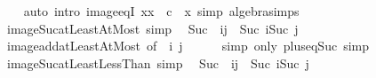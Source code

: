\begin{isabellebody}
%
\isadelimproof
\ \ %
\endisadelimproof
%
\isatagproof
{}\isamarkupfalse%
\ {\isacharparenleft}{\kern0pt}auto\ intro{\isacharbang}{\kern0pt}{\isacharcolon}{\kern0pt}\ image{\isacharunderscore}{\kern0pt}eqI{\isacharbrackleft}{\kern0pt}\ x{\isacharequal}{\kern0pt}{\isachardoublequoteopen}x\ {\isacharminus}{\kern0pt}\ c{\isachardoublequoteclose}\ \ x{\isacharbrackright}{\kern0pt}\ simp{\isacharcolon}{\kern0pt}\ algebra{\isacharunderscore}{\kern0pt}simps{\isacharparenright}{\kern0pt}%
\endisatagproof
{\isafoldproof}%
%
\isadelimproof
\isanewline
%
\endisadelimproof
\isanewline
{}\isamarkupfalse%
\isanewline
\isanewline
{}\isamarkupfalse%
\ image{\isacharunderscore}{\kern0pt}Suc{\isacharunderscore}{\kern0pt}atLeastAtMost\ {\isacharbrackleft}{\kern0pt}simp{\isacharbrackright}{\kern0pt}{\isacharcolon}{\kern0pt}\isanewline
\ \ {\isachardoublequoteopen}Suc\ {\isacharbackquote}{\kern0pt}\ {\isacharbraceleft}{\kern0pt}i{\isachardot}{\kern0pt}{\isachardot}{\kern0pt}j{\isacharbraceright}{\kern0pt}\ {\isacharequal}{\kern0pt}\ {\isacharbraceleft}{\kern0pt}Suc\ i{\isachardot}{\kern0pt}{\isachardot}{\kern0pt}Suc\ j{\isacharbraceright}{\kern0pt}{\isachardoublequoteclose}\isanewline
%
\isadelimproof
\ \ %
\endisadelimproof
%
\isatagproof
{}\isamarkupfalse%
\ image{\isacharunderscore}{\kern0pt}add{\isacharunderscore}{\kern0pt}atLeastAtMost\ {\isacharbrackleft}{\kern0pt}of\ {}\ i\ j{\isacharbrackright}{\kern0pt}\isanewline
\ \ \ \ \isamarkupfalse%
\ {\isacharparenleft}{\kern0pt}simp\ only{\isacharcolon}{\kern0pt}\ plus{\isacharunderscore}{\kern0pt}{}{\isacharunderscore}{\kern0pt}eq{\isacharunderscore}{\kern0pt}Suc{\isacharparenright}{\kern0pt}\ simp%
\endisatagproof
{\isafoldproof}%
%
\isadelimproof
\isanewline
%
\endisadelimproof
\isanewline
{}\isamarkupfalse%
\ image{\isacharunderscore}{\kern0pt}Suc{\isacharunderscore}{\kern0pt}atLeastLessThan\ {\isacharbrackleft}{\kern0pt}simp{\isacharbrackright}{\kern0pt}{\isacharcolon}{\kern0pt}\isanewline
\ \ {\isachardoublequoteopen}Suc\ {\isacharbackquote}{\kern0pt}\ {\isacharbraceleft}{\kern0pt}i{\isachardot}{\kern0pt}{\isachardot}{\kern0pt}{\isacharless}{\kern0pt}j{\isacharbraceright}{\kern0pt}\ {\isacharequal}{\kern0pt}\ {\isacharbraceleft}{\kern0pt}Suc\ i{\isachardot}{\kern0pt}{\isachardot}{\kern0pt}{\isacharless}{\kern0pt}Suc\ j{\isacharbraceright}{\kern0pt}{\isachardoublequoteclose}\isanewline
%
\isadelimproof
\ \ %
\endisadelimproof
%
\isatagproof
{}\isamarkupfalse%

\end{isabellebody}

